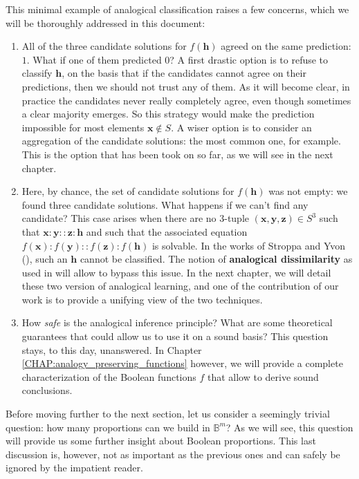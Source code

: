 This minimal example of analogical classification raises a few concerns, which
we will be thoroughly addressed in this document:
\begin{enumerate}
  \item All of the three candidate solutions for $f(\mathbf{h})$ agreed on the
    same prediction: $1$. What if one of them predicted $0$? A first drastic
    option is to refuse to classify $\mathbf{h}$, on the basis that if the
    candidates cannot agree on their predictions, then we should not trust any
    of them. As it will become clear, in practice the candidates never really
    completely agree, even though sometimes a clear majority emerges. So this
    strategy would make the prediction impossible for most elements $\mathbf{x}
    \notin S$. A wiser option is to consider an aggregation of the candidate
    solutions: the most common one, for example. This is the option that has
    been took on so far, as we will see in the next chapter.
  \item Here, by chance, the set of candidate solutions for $f(\mathbf{h})$ was
    not empty: we found three candidate solutions. What happens if we can't
    find any candidate? This case arises when there are no 3-tuple
    $(\mathbf{x}, \mathbf{y}, \mathbf{z}) \in S^3$ such that $\mathbf{x} :
    \mathbf{y}::\mathbf{z}:\mathbf{h}$ and such that the associated equation
    $f(\mathbf{x}):f(\mathbf{y})::f(\mathbf{z}):f(\mathbf{h})$ is solvable. In
    the works of Stroppa and Yvon (\cite{StrYvoCNLL05}), such an $\mathbf{h}$
    cannot be classified. The notion of \textbf{analogical dissimilarity} as
    used in \cite{BayMicDelIJCAI07} will allow to bypass this issue. In the
    next chapter, we will detail these two version of analogical learning, and
    one of the contribution of our work is to provide a unifying view of the
    two techniques.
  \item How \textit{safe} is the analogical inference principle? What are some
    theoretical guarantees that could allow us to use it on a sound basis? This
    question stays, to this day, unanswered. In Chapter
    \ref{CHAP:analogy_preserving_functions} however, we will provide a complete
    characterization of the Boolean functions $f$ that
    allow to derive sound conclusions.
\end{enumerate}

Before moving further to the next section, let us  consider a seemingly trivial
question: how many proportions can we build in $\mathbb{B}^m$? As we will see,
this question will provide us some further insight about Boolean proportions.
This last discussion is, however, not as important as the previous ones and can
safely be ignored by the impatient reader.

